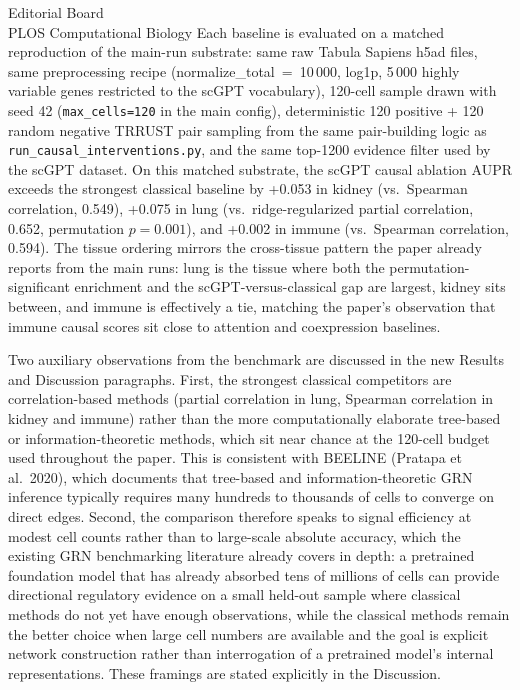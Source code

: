 \documentclass[11pt,letterpaper]{letter}
\begin{document}
\begin{letter}{Editorial Board\\
PLOS Computational Biology}
Each baseline is evaluated on a matched reproduction of the main-run
substrate: same raw Tabula Sapiens h5ad files, same preprocessing recipe
(normalize\_total~=~10\,000, log1p, 5\,000 highly variable genes
restricted to the scGPT vocabulary), 120-cell sample drawn with seed 42
(\texttt{max\_cells=120} in the main config), deterministic 120 positive
+ 120 random negative TRRUST pair sampling from the same pair-building
logic as \texttt{run\_causal\_interventions.py}, and the same top-1200
evidence filter used by the scGPT dataset. On this matched substrate, the
scGPT causal ablation AUPR exceeds the strongest classical baseline by
+0.053 in kidney (vs.\ Spearman correlation, 0.549), +0.075 in lung
(vs.\ ridge-regularized partial correlation, 0.652, permutation
$p{=}0.001$), and +0.002 in immune (vs.\ Spearman correlation, 0.594).
The tissue ordering mirrors the cross-tissue pattern the paper already
reports from the main runs: lung is the tissue where both the
permutation-significant enrichment and the scGPT-versus-classical gap
are largest, kidney sits between, and immune is effectively a tie,
matching the paper's observation that immune causal scores sit close to
attention and coexpression baselines.

Two auxiliary observations from the benchmark are discussed in the new
Results and Discussion paragraphs. First, the strongest classical
competitors are correlation-based methods (partial correlation in lung,
Spearman correlation in kidney and immune) rather than the more
computationally elaborate tree-based or information-theoretic methods,
which sit near chance at the 120-cell budget used throughout the paper.
This is consistent with BEELINE (Pratapa et al.\ 2020), which documents
that tree-based and information-theoretic GRN inference typically
requires many hundreds to thousands of cells to converge on direct
edges. Second, the comparison therefore speaks to signal efficiency at
modest cell counts rather than to large-scale absolute accuracy, which
the existing GRN benchmarking literature already covers in depth: a
pretrained foundation model that has already absorbed tens of millions
of cells can provide directional regulatory evidence on a small held-out
sample where classical methods do not yet have enough observations, while
the classical methods remain the better choice when large cell numbers
are available and the goal is explicit network construction rather than
interrogation of a pretrained model's internal representations. These
framings are stated explicitly in the Discussion.


\end{letter}
\end{document}
